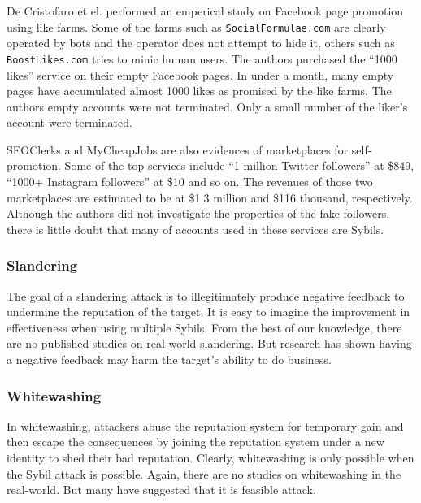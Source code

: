 De Cristofaro et el. performed an emperical study on Facebook page promotion
using like farms\cite{de2014paying}. Some of the farms such as
\verb!SocialFormulae.com! are clearly operated by bots and the operator does not
attempt to hide it, others such as \verb!BoostLikes.com! tries to minic human
users. The authors purchased the ``1000 likes'' service on their empty Facebook pages.
In under a month, many empty pages have accumulated almost 1000 likes as
promised by the like farms. The authors empty accounts were not terminated. Only
a small number of the liker's account were terminated.


SEOClerks and MyCheapJobs are also evidences of marketplaces for self-promotion.
Some of the top services include ``1 million Twitter followers'' at \$849,
``1000+ Instagram followers'' at \$10 and so on. The revenues of those two
marketplaces are estimated to be at \$1.3 million and \$116 thousand,
respectively\cite{farooqi2015characterizing}. Although the authors did not
investigate the properties of the fake followers, there is little doubt that
many of accounts used in these services are Sybils.

\subsubsection{Slandering}
The goal of a slandering attack is to illegitimately produce negative feedback
to undermine the reputation of the target. It is easy to imagine the improvement
in effectiveness when using multiple Sybils. From the best of our knowledge,
there are no published studies on real-world slandering. But
research has shown having a negative feedback may harm the target's ability to
do business\cite{ba2002evidence}.

\subsubsection{Whitewashing}
In whitewashing, attackers abuse the reputation system for temporary gain and
then escape the consequences by joining the reputation system under a new
identity to shed their bad reputation. Clearly, whitewashing is only possible
when the Sybil attack is possible. Again, there are no studies on whitewashing
in the real-world. But many have suggested that it is feasible
attack\cite{hoffman2009survey, marti2006taxonomy}.


